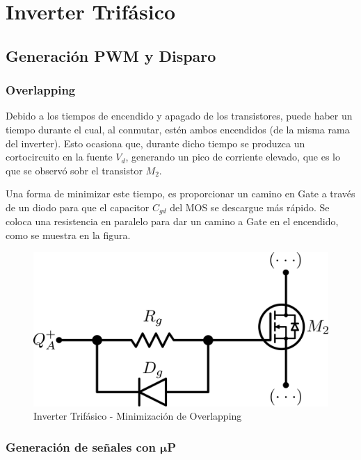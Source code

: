 \documentclass[e4_tp3_main.tex]{subfiles}
\begin{document}

\section{Inverter Trifásico}

\subsection{Generación PWM y Disparo}

\subsubsection{Overlapping}

Debido a los tiempos de encendido y apagado de los transistores, puede haber un tiempo durante el cual, al conmutar, estén ambos encendidos (de la misma rama del inverter). Esto ocasiona que, durante dicho tiempo se produzca un cortocircuito en la fuente $V_d$, generando un pico de corriente elevado, que es lo que se observó sobr el transistor $M_2$. \par
Una forma de minimizar este tiempo, es proporcionar un camino en Gate a través de un diodo para que el capacitor $C_{gd}$ del MOS se descargue más rápido. Se coloca una resistencia en paralelo para dar un camino a Gate en el encendido, como se muestra en la figura.

\begin{figure}[H]
\centering
\includegraphics[width=0.5\linewidth]{Imagenes/overlap.png}
\caption{Inverter Trifásico - Minimización de Overlapping}
\end{figure}

\subsubsection{Generación de señales con $\mathbf{\mu}$P}
\end{document}
